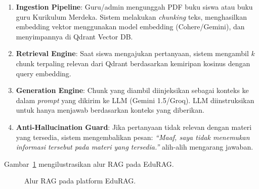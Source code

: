 \documentclass[12pt,a4paper]{article}
\newcommand{\edurag}{EduRAG}
\begin{document}
\begin{enumerate}
  \item \textbf{Ingestion Pipeline}: Guru/admin mengunggah PDF buku
        siswa atau buku guru Kurikulum Merdeka. Sistem melakukan
        \textit{chunking} teks, menghasilkan embedding vektor menggunakan
        model embedding (Cohere/Gemini), dan menyimpannya di Qdrant
        Vector DB.
  \item \textbf{Retrieval Engine}: Saat siswa mengajukan pertanyaan,
        sistem mengambil $k$ chunk terpaling relevan dari Qdrant
        berdasarkan kemiripan kosinus dengan query embedding.
  \item \textbf{Generation Engine}: Chunk yang diambil diinjeksikan
        sebagai konteks ke dalam \textit{prompt} yang dikirim ke LLM
        (Gemini 1.5/Groq). LLM diinstruksikan untuk hanya menjawab
        berdasarkan konteks yang diberikan.
  \item \textbf{Anti-Hallucination Guard}: Jika pertanyaan tidak
        relevan dengan materi yang tersedia, sistem mengembalikan
        pesan: \textit{``Maaf, saya tidak menemukan informasi tersebut
        pada materi yang tersedia.''} alih-alih mengarang jawaban.
\end{enumerate}

Gambar~\ref{fig:edurag} mengilustrasikan alur RAG pada \edurag{}.

\begin{figure}[htbp]
\centering
{}
\caption{Alur RAG pada platform \edurag{}.}
\label{fig:edurag}
\end{figure}
\end{document}
